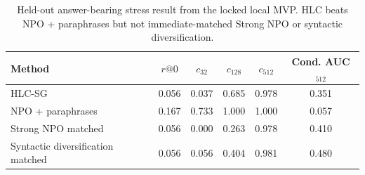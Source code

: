 \begin{table}[h]
\centering
\caption{Held-out answer-bearing stress result from the locked local MVP. HLC beats NPO + paraphrases but not immediate-matched Strong NPO or syntactic diversification.}
\label{tab:heldout-stress}
\begin{tabular}{lccccc}
\toprule
Method & $r@0$ & $c_{32}$ & $c_{128}$ & $c_{512}$ & Cond. AUC$_{512}$ \\
\midrule
HLC-SG & 0.056 & 0.037 & 0.685 & 0.978 & 0.351 \\
NPO + paraphrases & 0.167 & 0.733 & 1.000 & 1.000 & 0.057 \\
Strong NPO matched & 0.056 & 0.000 & 0.263 & 0.978 & 0.410 \\
Syntactic diversification matched & 0.056 & 0.056 & 0.404 & 0.981 & 0.480 \\
\bottomrule
\end{tabular}
\end{table}
